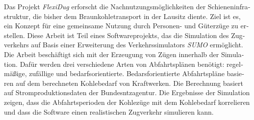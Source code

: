 
%
%



\null\vfil
\begin{otherlanguage}{ngerman}
\begin{center}\textsf{\textbf{\abstractname}}\end{center}

\noindent Das Projekt \emph{FlexiDug} erforscht die Nachnutzungsmöglichkeiten der Schieneninfrastruktur, die bisher dem Braunkohletransport in der Lausitz diente. Ziel ist es, ein Konzept für eine gemeinsame Nutzung durch Personen- und Güterzüge zu erstellen. Diese Arbeit ist Teil eines Softwareprojekts, das die Simulation des Zugverkehrs auf Basis einer Erweiterung des Verkehrssimulators \emph{SUMO} ermöglicht. Die Arbeit beschäftigt sich mit der Erzeugung von Zügen innerhalb der Simulation. Dafür werden drei verschiedene Arten von Abfahrtsplänen benötigt: regelmäßige, zufällige und bedarfsorientierte. Bedarsforientierte Abfahrtspläne basieren auf dem berechneten Kohlebedarf von Kraftwerken. Die Berechnung basiert auf Stromproduktionsdaten der Bundesntzagentur. Die Ergebnisse der Simulation zeigen, dass die Abfahrtsperioden der Kohlezüge mit dem Kohlebedarf korrelieren und dass die Software einen realistischen Zugverkehr simulieren kann.

\end{otherlanguage}
\vfil\null



